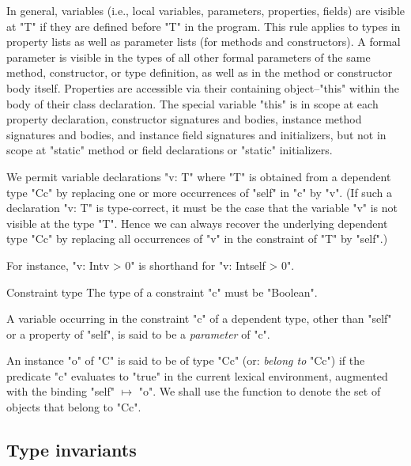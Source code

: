 In general, variables (i.e., local variables, parameters,
properties, fields) are visible at
\xcd"T" if they are defined before \xcd"T" in the program. This rule applies to
types in property lists as well as parameter lists (for methods and
constructors).
A formal parameter is visible in the types of all other formal
parameters of the same method, constructor, or type definition,
as well as in the method or constructor body itself.
Properties are accessible via their containing object--\xcd"this"
within the body of their class declaration.  The special
variable \xcd"this" is in scope at each property
declaration, constructor signatures and bodies, instance method signatures
and bodies,
and instance field signatures and initializers, but not in scope
at \xcd"static" method or field declarations or \xcd"static"
initializers.  

We permit variable declarations \xcd"v: T" where \xcd"T" is obtained
from a dependent type \xcd"C{c}" by replacing one or more occurrences
of \xcd"self" in \xcd"c" by \xcd"v". (If such a declaration \xcd"v: T"
is type-correct, it must be the case that the variable \xcd"v" is not
visible at the type \xcd"T". Hence we can always recover the
underlying dependent type \xcd"C{c}" by replacing all occurrences of \xcd"v"
in the constraint of \xcd"T" by \xcd"self".)

For instance, \xcd"v: Int{v > 0}" is shorthand for \xcd"v: Int{self > 0}".

\begin{staticrule}{Constraint type}
The type of a constraint \xcd"c" must be \xcd"Boolean".  
\end{staticrule}

A variable occurring in the constraint \xcd"c" of a dependent type, other than
\xcd"self" or a property of \xcd"self", is said to be a {\em
parameter} of \xcd"c".\label{DepType:Parameter} 

An instance \xcd"o" of \xcd"C" is said to be of type \xcd"C{c}"
(or: {\em belong to}
\xcd"C{c}") if the predicate \xcd"c" evaluates to \xcd"true" in the current lexical
environment, augmented with the binding \xcd"self" $\mapsto$ \xcd"o". We shall
use the function  to denote the set of
objects that belong to \xcd"C{c}". 

\subsection{Type invariants}\label{DepType:TypeInvariant}
\label{DepType:Where}

